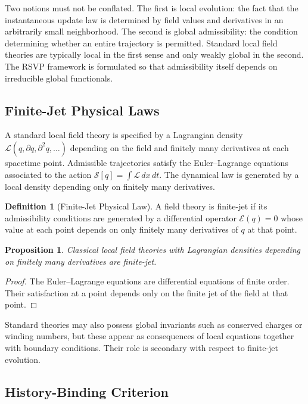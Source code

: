 \documentclass[12pt, a4paper]{article}
\theoremstyle{plain}
\newtheorem{proposition}[theorem]{Proposition}
\theoremstyle{definition}
\newtheorem{definition}[theorem]{Definition}
\theoremstyle{remark}
\begin{document}
Two notions must not be conflated. The first is local evolution: the fact that the instantaneous update law is determined by field values and derivatives in an arbitrarily small neighborhood. The second is global admissibility: the condition determining whether an entire trajectory is permitted. Standard local field theories are typically local in the first sense and only weakly global in the second. The RSVP framework is formulated so that admissibility itself depends on irreducible global functionals.

\subsection{Finite-Jet Physical Laws}

A standard local field theory is specified by a Lagrangian density $\mathcal{L}(q, \partial q, \partial^2 q, \dots)$ depending on the field and finitely many derivatives at each spacetime point. Admissible trajectories satisfy the Euler--Lagrange equations associated to the action $\mathcal{S}[q] = \int \mathcal{L}\,dx\,dt$. The dynamical law is generated by a local density depending only on finitely many derivatives.

\begin{definition}[Finite-Jet Physical Law]
A field theory is finite-jet if its admissibility conditions are generated by a differential operator $\mathcal{E}(q) = 0$ whose value at each point depends on only finitely many derivatives of $q$ at that point.
\end{definition}

\begin{proposition}
Classical local field theories with Lagrangian densities depending on finitely many derivatives are finite-jet.
\end{proposition}

\begin{proof}
The Euler--Lagrange equations are differential equations of finite order. Their satisfaction at a point depends only on the finite jet of the field at that point.
\end{proof}

Standard theories may also possess global invariants such as conserved charges or winding numbers, but these appear as consequences of local equations together with boundary conditions. Their role is secondary with respect to finite-jet evolution.

\subsection{History-Binding Criterion}
\end{document}
